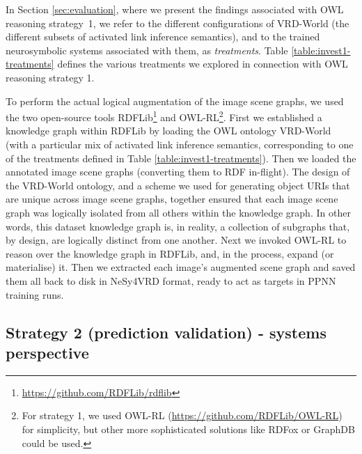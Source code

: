 \documentclass[]{jair}
\begin{document}
In Section \ref{sec:evaluation}, where we present the findings associated with OWL reasoning strategy~1, we refer to the different configurations of VRD-World (the different subsets of activated link inference semantics), and to the trained neurosymbolic systems associated with them, as \emph{treatments}.
Table \ref{table:invest1-treatments} defines the various treatments we explored in connection with OWL reasoning strategy 1.

To perform the actual logical augmentation of the image scene graphs, we used the two open-source tools RDFLib\footnote{\url{https://github.com/RDFLib/rdflib}} and OWL-RL\footnote{For strategy 1, we used OWL-RL (\url{https://github.com/RDFLib/OWL-RL}) for simplicity, but other more sophisticated solutions like RDFox \cite{DBLP:conf/semweb/NenovPMHWB15} or GraphDB \cite{graphdb} could be used.}.
First we established a knowledge graph within RDFLib by loading the OWL ontology VRD-World (with a particular mix of activated link inference semantics, corresponding to one of the treatments defined in Table \ref{table:invest1-treatments}).
Then we loaded the annotated image scene graphs (converting them to RDF in-flight).
The design of the VRD-World ontology, and a scheme we used for generating object URIs that are unique across image scene graphs, together ensured that each image scene graph was logically isolated from all others within the knowledge graph.
In other words, this dataset knowledge graph is, in reality, a collection of subgraphs that, by design, are logically distinct from one another.
Next we invoked OWL-RL to reason over the knowledge graph in RDFLib, and, in the process, expand (or materialise) it.
Then we extracted each image's augmented scene graph and saved them all back to disk in NeSy4VRD format, ready to act as targets in PPNN training runs.

\subsection{Strategy 2 (prediction validation) - systems perspective}
\label{sec:kg4pval-methods}
\end{document}
